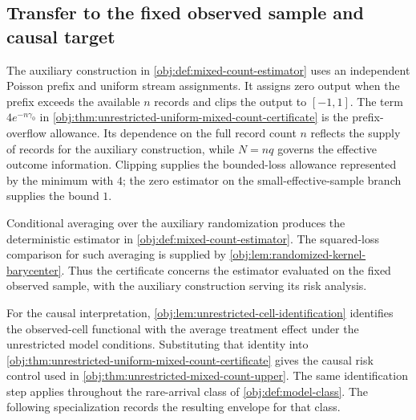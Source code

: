 \subsection{Transfer to the fixed observed sample and causal target}

The auxiliary construction in \cref{obj:def:mixed-count-estimator} uses an independent Poisson prefix and uniform stream assignments. It assigns zero output when the prefix exceeds the available \(n\) records and clips the output to \([-1,1]\). The term \(4e^{-n\gamma_0}\) in \cref{obj:thm:unrestricted-uniform-mixed-count-certificate} is the prefix-overflow allowance. Its dependence on the full record count \(n\) reflects the supply of records for the auxiliary construction, while \(N=nq\) governs the effective outcome information. Clipping supplies the bounded-loss allowance represented by the minimum with \(4\); the zero estimator on the small-effective-sample branch supplies the bound \(1\).

Conditional averaging over the auxiliary randomization produces the deterministic estimator in \cref{obj:def:mixed-count-estimator}. The squared-loss comparison for such averaging is supplied by \cref{obj:lem:randomized-kernel-barycenter}. Thus the certificate concerns the estimator evaluated on the fixed observed sample, with the auxiliary construction serving its risk analysis.

For the causal interpretation, \cref{obj:lem:unrestricted-cell-identification} identifies the observed-cell functional with the average treatment effect under the unrestricted model conditions. Substituting that identity into \cref{obj:thm:unrestricted-uniform-mixed-count-certificate} gives the causal risk control used in \cref{obj:thm:unrestricted-mixed-count-upper}. The same identification step applies throughout the rare-arrival class  of \cref{obj:def:model-class}. The following specialization records the resulting envelope for that class.

